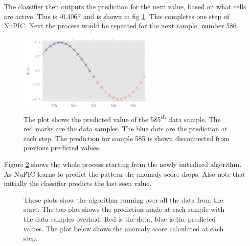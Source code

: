 \documentclass[a4paper]{jpconf}
\begin{document}
		The classifier then outputs the prediction for the next value, based on what cells are active. This is -0.4067 and is shown in fig \ref{fig:examplePrediction}. This completes one step of NuPIC. Next the process would be repeated for the next sample, number 586.
		\begin{figure}
			\centering
			\includegraphics[width=0.6\textwidth]{examplePredictionPlot.pdf}
			\caption{\label{fig:examplePrediction}The plot shows the predicted value of the 585\textsuperscript{th} data sample. The red marks are the data samples. The blue dots are the prediction at each step. The prediction for sample 585 is shown disconnected from previous predicted values.}
		\end{figure}
		
		Figure \ref{fig:exampleResult} shows the whole process starting from the newly initialised algorithm. As NuPIC learns to predict the pattern the anomaly score drops. Also note that initially the classifier predicts the last seen value.
		\begin{figure}
			\centering
			\caption{\label{fig:exampleResult}These plots show the algorithm running over all the data from the start. The top plot shows the prediction made at each sample with the data samples overlaid. Red is the data, blue is the predicted values. The plot below shows the anomaly score calculated at each step.}
		\end{figure}
\end{document}
